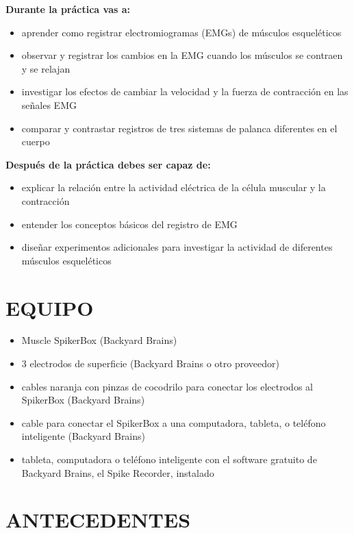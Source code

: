 \documentclass[12pt]{article}
\begin{document}
\vspace{0.3cm}

\textbf{Durante la práctica vas a:}
\begin{itemize}
\item aprender como registrar electromiogramas (EMGs) de músculos esqueléticos
\item observar y registrar los cambios en la EMG cuando los músculos se contraen y se relajan
\item investigar los efectos de cambiar la velocidad y la fuerza de contracción en las señales EMG
\item comparar y contrastar registros de tres sistemas de palanca diferentes en el cuerpo
\end{itemize}

\vspace{0.3cm}
 
\textbf{Después de la práctica debes ser capaz de:}
\begin{itemize}
\item explicar la relación entre la actividad eléctrica de la célula muscular y la contracción 
\item entender los conceptos básicos del registro de EMG
\item diseñar experimentos adicionales para investigar la actividad de diferentes músculos esqueléticos
\end{itemize}

\section*{EQUIPO}

\begin{itemize}
\item Muscle SpikerBox (Backyard Brains)
\item 3 electrodos de superficie (Backyard Brains o otro proveedor)
\item cables naranja con pinzas de cocodrilo para conectar los electrodos al SpikerBox (Backyard Brains)
\item cable para conectar el SpikerBox a una computadora, tableta, o
  teléfono inteligente (Backyard Brains)
\item tableta, computadora o teléfono inteligente con el software
  gratuito de Backyard Brains, el Spike Recorder, instalado
\end{itemize}

\section*{ANTECEDENTES}
\end{document}
